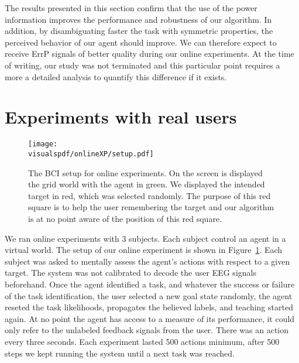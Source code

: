 The results presented in this section confirm that the use of the power information improves the performance and robustness of our algorithm. In addition, by disambiguating faster the task with symmetric properties, the perceived behavior of our agent should improve. We can therefore expect to receive ErrP signals of better quality during our online experiments. At the time of writing, our study was not terminated and this particular point requires a more a detailed analysis to quantify this difference if it exists.


\section{Experiments with real users}

\begin{figure}[!htbp]
\centering
\texttt{[image: \\visualspdf/onlineXP/setup.pdf]}
\caption{The BCI setup for online experiments. On the screen is displayed the grid world with the agent in green. We displayed the intended target in red, which was selected randomly. The purpose of this red square is to help the user remembering the target and our algorithm is at no point aware of the position of this red square.}
\label{fig:BCIsetup}
\end{figure}

We ran online experiments with 3 subjects. Each subject control an agent in a virtual world. The setup of our online experiment is shown in Figure~\ref{fig:BCIsetup}. Each subject was asked to mentally assess the agent's actions with respect to a given target. The system was not calibrated to decode the user EEG signals beforehand. Once the agent identified a task, and whatever the success or failure of the task identification, the user selected a new goal state randomly, the agent reseted the task likelihoods, propagates the believed labels, and teaching started again. At no point the agent has access to a measure of its performance, it could only refer to the unlabeled feedback signals from the user. There was an action every three seconds. Each experiment lasted 500 actions minimum, after 500 steps we kept running the system until a next task was reached.

